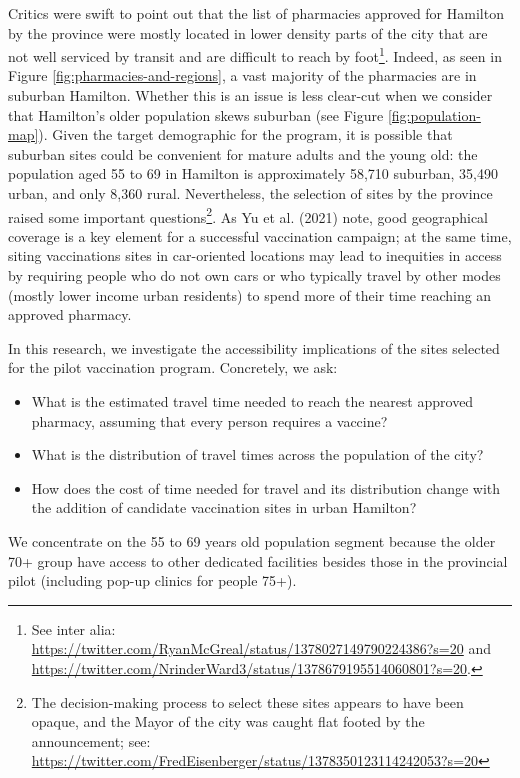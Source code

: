 \documentclass[]{elsarticle} %
\providecommand{\tightlist}{%
  \setlength{\itemsep}{0pt}\setlength{\parskip}{0pt}}
\begin{document}
Critics were swift to point out that the list of pharmacies approved for
Hamilton by the province were mostly located in lower density parts of
the city that are not well serviced by transit and are difficult to
reach by
foot\footnote{See inter alia: \url{https://twitter.com/RyanMcGreal/status/1378027149790224386?s=20} and \url{https://twitter.com/NrinderWard3/status/1378679195514060801?s=20}.}.
Indeed, as seen in Figure \ref{fig:pharmacies-and-regions}, a vast
majority of the pharmacies are in suburban Hamilton. Whether this is an
issue is less clear-cut when we consider that Hamilton's older
population skews suburban (see Figure \ref{fig:population-map}). Given
the target demographic for the program, it is possible that suburban
sites could be convenient for mature adults and the young old: the
population aged 55 to 69 in Hamilton is approximately 58,710 suburban,
35,490 urban, and only 8,360 rural. Nevertheless, the selection of sites
by the province raised some important
questions\footnote{The decision-making process to select these sites appears to have been opaque, and the Mayor of the city was caught flat footed by the announcement; see: \url{https://twitter.com/FredEisenberger/status/1378350123114242053?s=20}}.
As Yu et al. (2021) note, good geographical coverage is a key element
for a successful vaccination campaign; at the same time, siting
vaccinations sites in car-oriented locations may lead to inequities in
access by requiring people who do not own cars or who typically travel
by other modes (mostly lower income urban residents) to spend more of
their time reaching an approved pharmacy.

In this research, we investigate the accessibility implications of the
sites selected for the pilot vaccination program. Concretely, we ask:

\begin{itemize}
\tightlist
\item
  What is the estimated travel time needed to reach the nearest approved
  pharmacy, assuming that every person requires a vaccine?
\item
  What is the distribution of travel times across the population of the
  city?
\item
  How does the cost of time needed for travel and its distribution
  change with the addition of candidate vaccination sites in urban
  Hamilton?
\end{itemize}

We concentrate on the 55 to 69 years old population segment because the
older 70+ group have access to other dedicated facilities besides those
in the provincial pilot (including pop-up clinics for people 75+).
\end{document}
